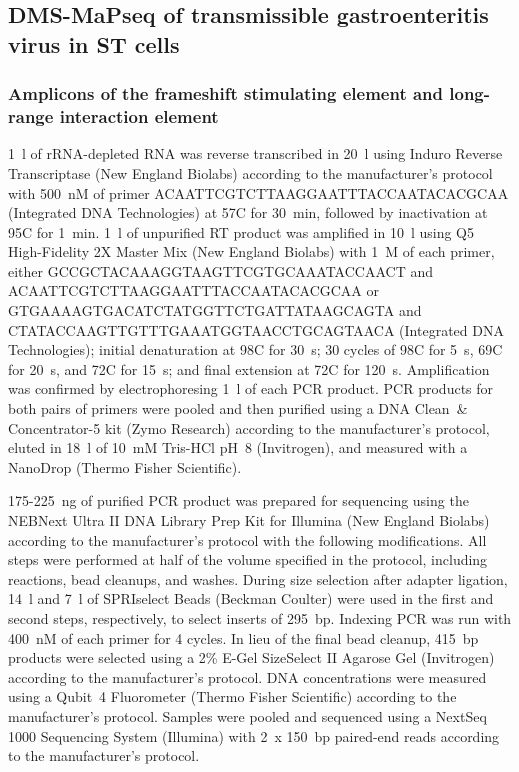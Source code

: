 \documentclass[main.tex]{subfiles}
\begin{document}
\subsection{DMS-MaPseq of transmissible gastroenteritis virus in ST cells}

\subsubsection{Amplicons of the frameshift stimulating element and long-range interaction element}

1~\textmu l of rRNA-depleted RNA was reverse transcribed in 20~\textmu l using Induro Reverse Transcriptase (New England Biolabs) according to the manufacturer's protocol with 500~nM of primer ACAATTCGTCTTAAGGAATTTACCAATACACGCAA (Integrated DNA Technologies) at 57\textdegree C for 30~min, followed by inactivation at 95\textdegree C for 1~min.
1~\textmu l of unpurified RT product was amplified in 10~\textmu l using Q5 High-Fidelity 2X Master Mix (New England Biolabs) with 1~\textmu M of each primer, either GCCGCTACAAAGGTAAGTTCGTGCAAATACCAACT and ACAATTCGTCTTAAGGAATTTACCAATACACGCAA or GTGAAAAGTGACATCTATGGTTCTGATTATAAGCAGTA and CTATACCAAGTTGTTTGAAATGGTAACCTGCAGTAACA (Integrated DNA Technologies); initial denaturation at 98\textdegree C for 30~s; 30 cycles of 98\textdegree C for 5~s, 69\textdegree C for 20~s, and 72\textdegree C for 15~s; and final extension at 72\textdegree C for 120~s.
Amplification was confirmed by electrophoresing 1~\textmu l of each PCR product.
PCR products for both pairs of primers were pooled and then purified using a DNA Clean~\& Concentrator-5 kit (Zymo Research) according to the manufacturer's protocol, eluted in 18~\textmu l of 10~mM Tris-HCl pH~8 (Invitrogen), and measured with a NanoDrop (Thermo Fisher Scientific).

175-225~ng of purified PCR product was prepared for sequencing using the NEBNext Ultra II DNA Library Prep Kit for Illumina (New England Biolabs) according to the manufacturer's protocol with the following modifications.
All steps were performed at half of the volume specified in the protocol, including reactions, bead cleanups, and washes.
During size selection after adapter ligation, 14~\textmu l and 7~\textmu l of SPRIselect Beads (Beckman Coulter) were used in the first and second steps, respectively, to select inserts of 295~bp.
Indexing PCR was run with 400~nM of each primer for 4 cycles.
In lieu of the final bead cleanup, 415~bp products were selected using a 2\% E-Gel SizeSelect II Agarose Gel (Invitrogen) according to the manufacturer's protocol.
DNA concentrations were measured using a Qubit~4 Fluorometer (Thermo Fisher Scientific) according to the manufacturer's protocol.
Samples were pooled and sequenced using a NextSeq 1000 Sequencing System (Illumina) with 2~x 150~bp paired-end reads according to the manufacturer's protocol.
\end{document}
